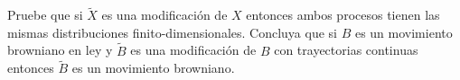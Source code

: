 \begin{problema}
	Pruebe que si $\tilde X$ es una modificaci\'on de $X$ entonces ambos procesos 
	tienen las mismas distribuciones finito-dimensionales. Concluya que si $B$ es 
	un movimiento browniano en ley y $\tilde B$ es una modificaci\'on de $B$ con 
	trayectorias continuas entonces $\tilde B$ es un movimiento browniano. 
\end{problema}